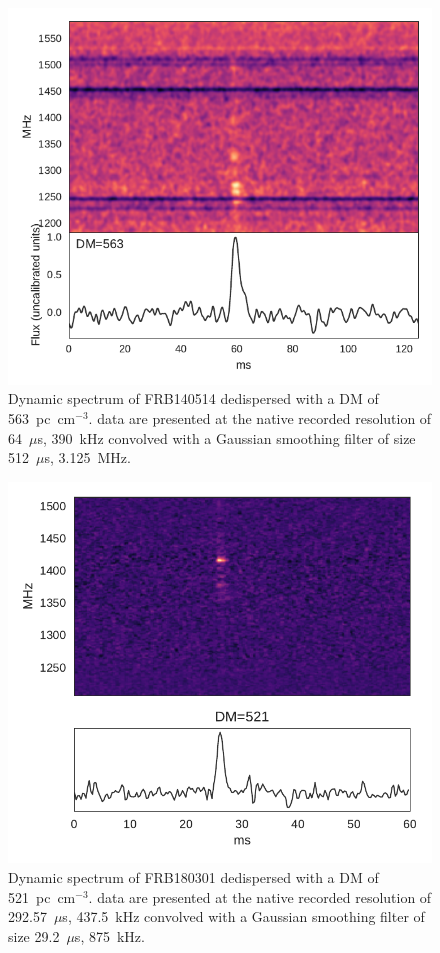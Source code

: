 \documentclass[a4paper,fleqn,usenatbib]{mnras}
\begin{document}
\begin{figure}
    \includegraphics[width=1.0\linewidth]{figures/FRB140514.pdf}
    \caption{Dynamic spectrum of FRB140514 dedispersed with a DM of
    563~pc~cm$^{-3}$.  data are presented at the native recorded resolution of
    64~$\mu$s, 390~kHz convolved with a Gaussian smoothing filter of size
    512~$\mu$s, 3.125~MHz.
    }
    \label{fig:FRB140514}
\end{figure}

\begin{figure}
    \includegraphics[width=1.0\linewidth]{figures/FRB180301.pdf}
    \caption{Dynamic spectrum of FRB180301 dedispersed with a DM of
    521~pc~cm$^{-3}$.  data are presented at the native recorded resolution of
    292.57~$\mu$s, 437.5~kHz convolved with a Gaussian smoothing filter of size
    29.2~$\mu$s, 875~kHz.
    }
    \label{fig:FRB180301}
\end{figure}
\end{document}
